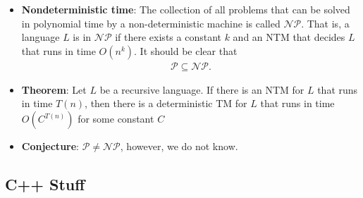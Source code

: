 \documentclass{report}
\begin{document}
\begin{itemize}
        \item \textbf{Nondeterministic time}: The collection of all problems that can be solved in polynomial time by a non-deterministic machine is called $\mathcal{NP}$. That is, a language $L$ is in $\mathcal{NP}$ if there exists a constant $k$ and an NTM that decides $L$ that runs in time $O(n^{k})$. It should be clear that
            \begin{align*}
                \mathcal{P} \subseteq \mathcal{NP}
            .\end{align*}
        \item \textbf{Theorem}: Let $L$ be a recursive language. If there is an NTM for $L$ that runs in time $T(n)$, then there is a deterministic TM for $L$ that runs in time $O(C^{T(n)}) $ for some constant $C$
        \item \textbf{Conjecture}: $\mathcal{P} \ne \mathcal{NP}$, however, we do not know.
    \end{itemize}






    \pagebreak 
    \bigbreak \noindent 
    \subsection{C++ Stuff}
    \bigbreak \noindent 
\end{document}
